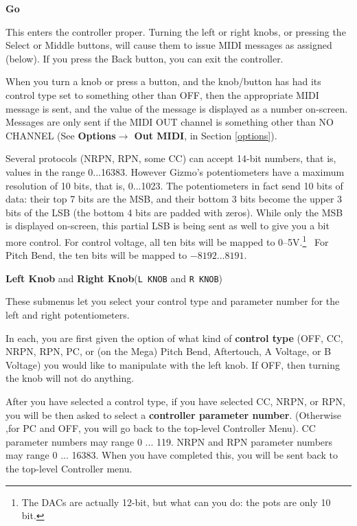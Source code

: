 \documentclass{article}
\begin{document}
	\begin{description}

	\item{\bf Go}
	
	This enters the controller proper.  Turning the left or right knobs, or pressing the Select or Middle buttons, will cause them to issue MIDI messages as assigned (below).  If you press the Back button, you can exit the controller.
	
	When you turn a knob or press a button, and the knob/button has had its control type set to something other than OFF, then the appropriate MIDI message is sent, and the value of the message is displayed as a number on-screen.  Messages are only sent if the MIDI OUT channel is something other than NO CHANNEL (See {\bf Options\(\boldsymbol\rightarrow\) Out MIDI}, in Section \ref{options}).
	
	Several protocols (NRPN, RPN, some CC) can accept 14-bit numbers, that is, values in the range 0...16383.  However Gizmo's potentiometers have a maximum resolution of 10 bits, that is, 0...1023.   The potentiometers in fact send 10 bits of data: their top 7 bits are the MSB, and their bottom 3 bits become the upper 3 bits of the LSB (the bottom 4 bits are padded with zeros).   While only the MSB is displayed on-screen, this partial LSB is being sent as well to give you a bit more control.  For control voltage, all ten bits will be mapped to 0--5V.\footnote{The DACs are actually 12-bit, but what can you do: the pots are only 10 bit.}  \ For Pitch Bend, the ten bits will be mapped to \(-8192...8191\).

	\item{\bf Left Knob} and {\bf Right Knob}\quad (\texttt{L KNOB} and \texttt{R KNOB})
	
	These submenus let you select your control type and parameter number for the left and right potentiometers.
	
	In each, you are first given the option of what kind of {\bf control type} (OFF, CC, NRPN, RPN, PC, or (on the Mega) Pitch Bend, Aftertouch, A Voltage, or B Voltage) you would like to manipulate with the left knob.  If OFF, then turning the knob will not do anything.

	After you have selected a control type, if you have selected CC, NRPN, or RPN, you will be then asked to select a {\bf controller parameter number}.  (Otherwise ,for PC and OFF, you will go back to the top-level Controller Menu).  CC parameter numbers may range 0 ... 119.  NRPN and RPN parameter numbers may range 0 ... 16383. When you have completed this, you will be sent back to the top-level Controller menu.


\end{description}
\end{document}
